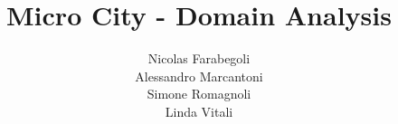 \title{Micro City - Domain Analysis}
\author{Nicolas Farabegoli\\
Alessandro Marcantoni\\
Simone Romagnoli\\
Linda Vitali}
